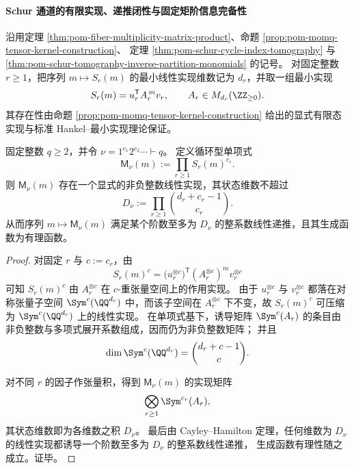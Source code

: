 \paragraph{Schur 通道的有限实现、递推闭性与固定矩阶信息完备性}
沿用定理 \ref{thm:pom-fiber-multiplicity-matrix-product}、命题 \ref{prop:pom-momq-tensor-kernel-construction}、
定理 \ref{thm:pom-schur-cycle-index-tomography} 与
\ref{thm:pom-schur-tomography-inverse-partition-monomials} 的记号。
对固定整数 \(r\ge 1\)，把序列 \(m\mapsto S_r(m)\) 的最小线性实现维数记为 \(d_r\)，并取一组最小实现
\[
S_r(m)=u_r^{\mathsf T}A_r^{\,m}v_r,
\qquad
A_r\in M_{d_r}(\ZZ_{\ge 0}).
\]
其存在性由命题 \ref{prop:pom-momq-tensor-kernel-construction} 给出的显式有限态实现与标准 Hankel--最小实现理论保证。

\begin{theorem}[循环型单项式的对称幂实现与递推阶上界]\label{thm:pom-partition-monomials-symmetric-power-realization-bound}
固定整数 \(q\ge 2\)，并令 \(\nu=1^{c_1}2^{c_2}\cdots\vdash q\)。
定义循环型单项式
\[
\mathsf{M}_\nu(m):=\prod_{r\ge 1}S_r(m)^{c_r}.
\]
则 \(\mathsf{M}_\nu(m)\) 存在一个显式的非负整数线性实现，其状态维数不超过
\[
D_\nu:=\prod_{r\ge 1}\binom{d_r+c_r-1}{c_r}.
\]
从而序列 \(m\mapsto \mathsf{M}_\nu(m)\) 满足某个阶数至多为 \(D_\nu\) 的整系数线性递推，且其生成函数为有理函数。
\end{theorem}
\begin{proof}
对固定 \(r\) 与 \(c:=c_r\)，由
\[
S_r(m)^c
=
\bigl(u_r^{\otimes c}\bigr)^{\mathsf T}(A_r^{\otimes c})^m v_r^{\otimes c}
\]
可知 \(S_r(m)^c\) 由 \(A_r^{\otimes c}\) 在 \(c\)-重张量空间上的作用实现。
由于 \(u_r^{\otimes c}\) 与 \(v_r^{\otimes c}\) 都落在对称张量子空间
\(
\Sym^c(\QQ^{d_r})
\)
中，而该子空间在 \(A_r^{\otimes c}\) 下不变，故 \(S_r(m)^c\) 可压缩为
\(\Sym^c(\QQ^{d_r})\)
上的线性实现。
在单项式基下，诱导矩阵 \(\Sym^c(A_r)\) 的条目由非负整数与多项式展开系数组成，因而仍为非负整数矩阵；
并且
\[
\dim \Sym^c(\QQ^{d_r})=\binom{d_r+c-1}{c}.
\]

对不同 \(r\) 的因子作张量积，得到 \(\mathsf{M}_\nu(m)\) 的实现矩阵
\[
\bigotimes_{r\ge 1}\Sym^{c_r}(A_r),
\]
其状态维数即为各维数之积 \(D_\nu\)。
最后由 Cayley--Hamilton 定理，任何维数为 \(D_\nu\) 的线性实现都诱导一个阶数至多为 \(D_\nu\) 的整系数线性递推，
生成函数有理性随之成立。证毕。
\end{proof}

